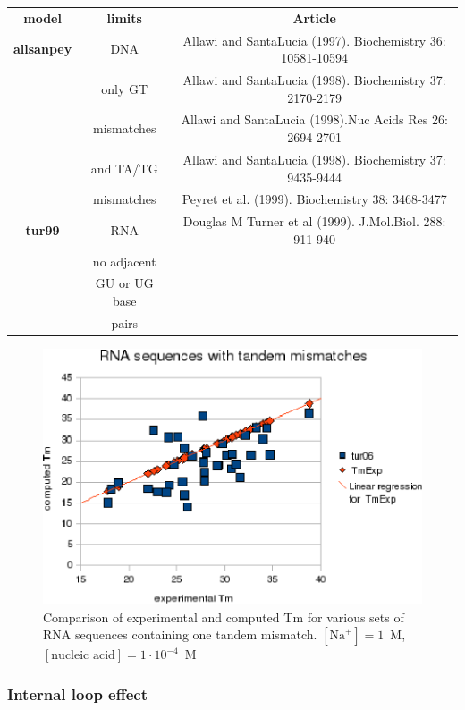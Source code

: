 \documentclass{article}
\begin{document}
\begin{table}[h]
\begin{tabular}[h]{| c | c | c |}
\textbf{model} & \textbf{limits} & \textbf{Article} \\
\textbf{allsanpey} & DNA & Allawi and SantaLucia (1997). Biochemistry 36: 10581-10594 \\
 & only GT  & Allawi and SantaLucia (1998). Biochemistry 37: 2170-2179 \\
 & mismatches & Allawi and SantaLucia (1998).Nuc Acids Res 26: 2694-2701 \\
 & and TA/TG & Allawi and SantaLucia (1998). Biochemistry 37: 9435-9444 \\
 & mismatches & Peyret et al. (1999). Biochemistry 38: 3468-3477\\
\textbf{tur99} & RNA & Douglas M Turner et al (1999). J.Mol.Biol.  288: 911-940 \\
 & no adjacent & \\
 & GU or UG base & \\
 &  pairs & \\
\end{tabular}
\end{table}

\begin{figure}[h]
\includegraphics{images/RNATandemMismatch.eps}
\caption{Comparison of experimental and computed Tm for various sets of
 RNA sequences containing one tandem mismatch. $[\mbox{Na}^+] = 1$~M, $[\mbox{nucleic acid}] = 1\cdot{}10^{-4}$~M}
\end{figure}

\subsubsection{Internal loop effect}
\end{document}

